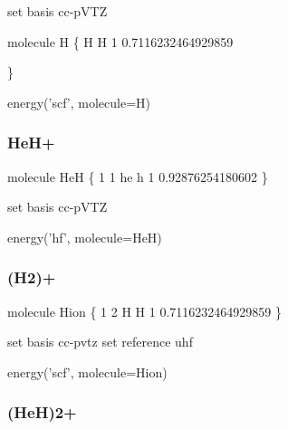 \documentclass[portuguese,]{article}
\newenvironment{Shaded}{}{}
\newcommand{\BuiltInTok}[1]{#1}
\newcommand{\DecValTok}[1]{\textcolor[rgb]{0.25,0.63,0.44}{#1}}
\newcommand{\FloatTok}[1]{\textcolor[rgb]{0.25,0.63,0.44}{#1}}
\newcommand{\NormalTok}[1]{#1}
\newcommand{\OperatorTok}[1]{\textcolor[rgb]{0.40,0.40,0.40}{#1}}
\newcommand{\StringTok}[1]{\textcolor[rgb]{0.25,0.44,0.63}{#1}}
\begin{document}
\begin{Shaded}
\begin{Highlighting}[]
\BuiltInTok{set}\NormalTok{ basis cc}\OperatorTok{-}\NormalTok{pVTZ   }

\NormalTok{molecule H \{}
\NormalTok{    H}
\NormalTok{    H }\DecValTok{1} \FloatTok{0.7116232464929859}

\NormalTok{\}}

\NormalTok{energy(}\StringTok{'scf'}\NormalTok{, molecule}\OperatorTok{=}\NormalTok{H)}
\end{Highlighting}
\end{Shaded}

\hypertarget{heh-1}{%
\subsubsection{HeH+}\label{heh-1}}

\begin{Shaded}
\begin{Highlighting}[]
\NormalTok{molecule HeH \{}
    \DecValTok{1} \DecValTok{1}
\NormalTok{    he}
\NormalTok{    h }\DecValTok{1} \FloatTok{0.92876254180602} 
\NormalTok{\}}

\BuiltInTok{set}\NormalTok{ basis cc}\OperatorTok{-}\NormalTok{pVTZ   }

\NormalTok{energy(}\StringTok{'hf'}\NormalTok{, molecule}\OperatorTok{=}\NormalTok{HeH)}
\end{Highlighting}
\end{Shaded}

\hypertarget{h2-3}{%
\subsubsection{(H2)+}\label{h2-3}}

\begin{Shaded}
\begin{Highlighting}[]
\NormalTok{molecule Hion \{}
    \DecValTok{1} \DecValTok{2}
\NormalTok{    H}
\NormalTok{    H }\DecValTok{1} \FloatTok{0.7116232464929859}
\NormalTok{\}}

\BuiltInTok{set}\NormalTok{ basis cc}\OperatorTok{-}\NormalTok{pvtz }
\BuiltInTok{set}\NormalTok{ reference uhf}

\NormalTok{energy(}\StringTok{'scf'}\NormalTok{, molecule}\OperatorTok{=}\NormalTok{Hion)}
\end{Highlighting}
\end{Shaded}

\hypertarget{heh2-1}{%
\subsubsection{(HeH)2+}\label{heh2-1}}
\end{document}
